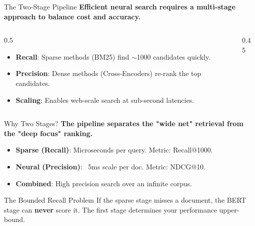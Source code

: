\documentclass[aspectratio=169]{beamer}
\newif\ifanimated
\newcommand{\cpause}{\ifanimated\pause\fi}
\begin{document}
\begin{frame}{The Two-Stage Pipeline}
\textbf{Efficient neural search requires a multi-stage approach to balance cost and accuracy.}

\vspace{0.8em}
\begin{columns}
\begin{column}{0.5\textwidth}
\begin{itemize}
    \item \textbf{Recall}: Sparse methods (BM25) find $\sim$1000 candidates quickly.
    \item \textbf{Precision}: Dense methods (Cross-Encoders) re-rank the top candidates.
    \item \textbf{Scaling}: Enables web-scale search at sub-second latencies.
\end{itemize}\cpause
\end{column}

\begin{column}{0.45\textwidth}
\begin{center}

\end{center}
\end{column}
\end{columns}
\end{frame}

\begin{frame}{Why Two Stages?}
\textbf{The pipeline separates the "wide net" retrieval from the "deep focus" ranking.}

\vspace{0.8em}
\begin{itemize}
    \item \textbf{Sparse (Recall)}: Microseconds per query. Metric: Recall@1000.
    \item \textbf{Neural (Precision)}: ~5ms scale per doc. Metric: NDCG@10.
    \item \textbf{Combined}: High precision search over an infinite corpus.
\end{itemize}\cpause

\vspace{1em}
\cpause
\begin{alertblock}{The Bounded Recall Problem}
If the sparse stage misses a document, the BERT stage can \textbf{never} score it. The first stage determines your performance upper-bound.
\end{alertblock}
\end{frame}
\end{document}
